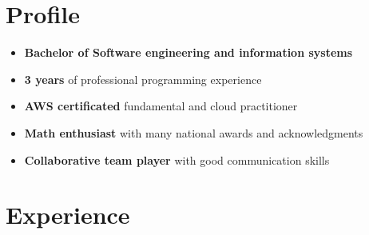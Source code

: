 \documentclass[letterpaper]{twentysecondcv} %
\begin{document}
\makesidebarFirst %

\section{Profile}

\begin{itemize}
	\item \textbf{Bachelor of Software engineering and information systems }
	\item \textbf{3 years} of professional programming experience
    \item \textbf{AWS certificated} fundamental and cloud practitioner 
	\item \textbf{Math enthusiast} with many national awards and acknowledgments
    \item \textbf{Collaborative team player} with good communication skills
\end{itemize}

\vspace{6mm}


\section{Experience}
\end{document}
